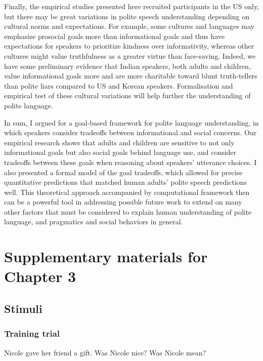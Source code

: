 \documentclass[oneside]{report}
\begin{document}
Finally, the empirical studies presented here recruited participants in
the US only, but there may be great variations in polite speech
understanding depending on cultural norms and expectations. For example,
some cultures and languages may emphasize prosocial goals more than
informational goals and thus have expectations for speakers to
prioritize kindness over informativity, whereas other cultures might
value truthfulness as a greater virtue than face-saving. Indeed, we have
some preliminary evidence that Indian speakers, both adults and
children, value informational goals more and are more charitable toward
blunt truth-tellers than polite liars compared to US and Korean
speakers. Formalisation and empirical test of these cultural variations
will help further the understanding of polite language.

In sum, I argued for a goal-based framework for polite language
understanding, in which speakers consider tradeoffs between
informational and social concerns. Our empirical research shows that
adults and children are sensitive to not only informational goals but
also social goals behind language use, and consider tradeoffs between
these goals when reasoning about speakers' utterance choices. I also
presented a formal model of the goal tradeoffs, which allowed for
precise quantitative predictions that matched human adults' polite
speech predictions well. This theoretical approach accompanied by
computational framework then can be a powerful tool in addressing
possible future work to extend on many other factors that must be
considered to explain human understanding of polite language, and
pragmatics and social behaviors in general.

\appendix

\chapter{Supplementary materials for Chapter
3}\label{supplementary-materials-for-chapter-3}

\section{Stimuli}\label{stimuli-1}

\subsection{Training trial}\label{training-trial}

Nicole gave her friend a gift. Was Nicole nice? Was Nicole mean?
\end{document}
